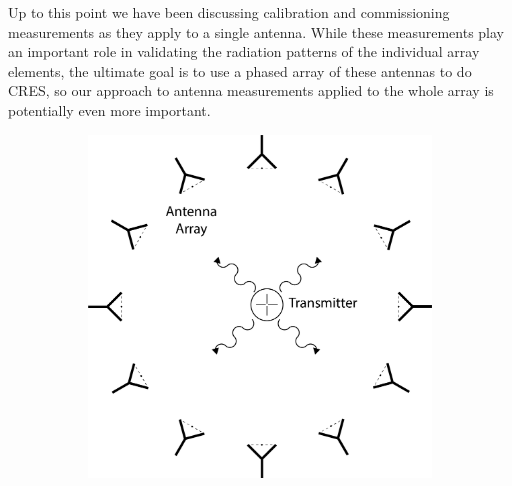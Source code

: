 Up to this point we have been discussing calibration and commissioning measurements as they apply to a single antenna. While these measurements play an important role in validating the radiation patterns of the individual array elements, the ultimate goal is to use a phased array of these antennas to do CRES, so our approach to antenna measurements applied to the whole array is potentially even more important. 
\begin{figure}[htbp]
    \centering
    \begin{subfigure}[b]{0.4\textwidth}
        \centering
        \includegraphics[width=1\textwidth]{figs/Chapter-5/230409_beamform_array_meas.png}
        \caption{\label{fig:beam-array-meas}}
    \end{subfigure}
    \hfill
    \begin{subfigure}[b]{0.4\textwidth}
        \centering

\end{subfigure}
\end{figure}
